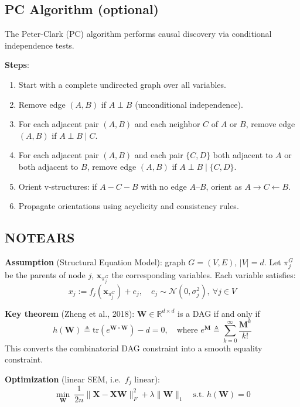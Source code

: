 \documentclass[UTF8]{ctexart}
\begin{document}
\subsection{PC Algorithm (optional)}

The Peter-Clark (PC) algorithm performs causal discovery via conditional independence tests.

\textbf{Steps}:
\begin{enumerate}
    \item Start with a complete undirected graph over all variables.
    \item Remove edge $(A,B)$ if $A \perp B$ (unconditional independence).
    \item For each adjacent pair $(A,B)$ and each neighbor $C$ of $A$ or $B$, remove edge $(A,B)$ if $A \perp B \mid C$.
    \item For each adjacent pair $(A,B)$ and each pair $\{C,D\}$ both adjacent to $A$ or both adjacent to $B$, remove edge $(A,B)$ if $A \perp B \mid \{C,D\}$.
    \item Orient v-structures: if $A - C - B$ with no edge $A$--$B$, orient as $A \to C \leftarrow B$.
    \item Propagate orientations using acyclicity and consistency rules.
\end{enumerate}

\subsection{NOTEARS}

\textbf{Assumption} (Structural Equation Model): graph $G=(V,E)$, $|V|=d$. Let $\pi_j^G$ be the parents of node $j$, $\mathbf{x}_{\pi_j^G}$ the corresponding variables. Each variable satisfies:
\[
    x_j := f_j\!\left(\mathbf{x}_{\pi_j^G}\right) + e_j, \quad e_j \sim \mathcal{N}(0, \sigma_j^2),\ \forall j \in V
\]

\textbf{Key theorem} (Zheng et al., 2018): $\mathbf{W} \in \mathbb{R}^{d\times d}$ is a DAG if and only if
\[
    h(\mathbf{W}) \triangleq \mathrm{tr}\!\left(e^{\mathbf{W} \circ \mathbf{W}}\right) - d = 0, \quad \text{where } e^{\mathbf{M}} \triangleq \sum_{k=0}^{\infty} \frac{\mathbf{M}^k}{k!}
\]
This converts the combinatorial DAG constraint into a smooth equality constraint.

\textbf{Optimization} (linear SEM, i.e.\ $f_j$ linear):
\[
    \min_{\mathbf{W}}\ \frac{1}{2n}\|\mathbf{X} - \mathbf{X}\mathbf{W}\|_F^2 + \lambda\|\mathbf{W}\|_1 \quad \text{s.t. } h(\mathbf{W}) = 0
\]
\end{document}
